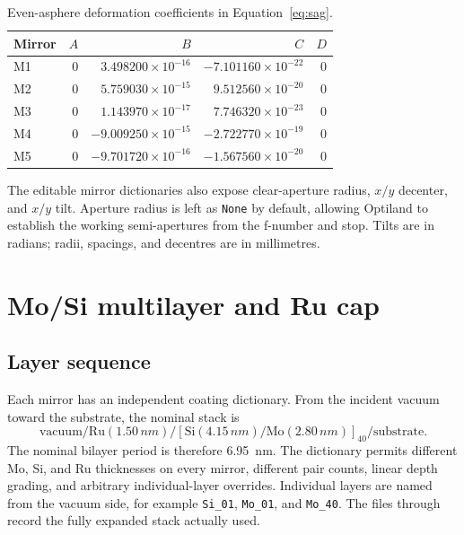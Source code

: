 \documentclass[11pt,a4paper]{article}
\begin{document}
\begin{table}[H]
\centering
\caption{Even-asphere deformation coefficients in Equation~\eqref{eq:sag}.}
\label{tab:aspheres}
\small
\begin{tabular}{@{}lrrrr@{}}
\toprule
Mirror & $A$ & $B$ & $C$ & $D$ \\
\midrule
M1 & 0 & $ 3.498200\times10^{-16}$ & $-7.101160\times10^{-22}$ & 0 \\
M2 & 0 & $ 5.759030\times10^{-15}$ & $ 9.512560\times10^{-20}$ & 0 \\
M3 & 0 & $ 1.143970\times10^{-17}$ & $ 7.746320\times10^{-23}$ & 0 \\
M4 & 0 & $-9.009250\times10^{-15}$ & $-2.722770\times10^{-19}$ & 0 \\
M5 & 0 & $-9.701720\times10^{-16}$ & $-1.567560\times10^{-20}$ & 0 \\
\bottomrule
\end{tabular}
\end{table}

The editable mirror dictionaries also expose clear-aperture radius, $x/y$
decenter, and $x/y$ tilt.  Aperture radius is left as \texttt{None} by default,
allowing Optiland to establish the working semi-apertures from the f-number and
stop.  Tilts are in radians; radii, spacings, and decentres are in millimetres.

\section{Mo/Si multilayer and Ru cap}

\subsection{Layer sequence}

Each mirror has an independent coating dictionary.  From the incident vacuum
toward the substrate, the nominal stack is
\begin{equation}
 \text{vacuum}/\mathrm{Ru}(1.50\,nm)/
 [\mathrm{Si}(4.15\,nm)/\mathrm{Mo}(2.80\,nm)]_{40}/\text{substrate}.
\end{equation}
The nominal bilayer period is therefore \SI{6.95}{nm}.  The dictionary permits
different Mo, Si, and Ru thicknesses on every mirror, different pair counts,
linear depth grading, and arbitrary individual-layer overrides.  Individual
layers are named from the vacuum side, for example \texttt{Si\_01},
\texttt{Mo\_01}, and \texttt{Mo\_40}.  The files
 through
 record the fully expanded stack actually used.
\end{document}

